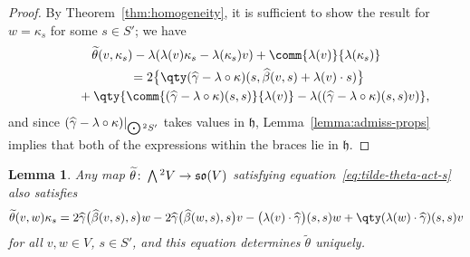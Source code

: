 \documentclass[pdftex]{sigma}
\numberwithin{equation}{section}
\newtheorem{Lemma}[Theorem]{Lemma}
\newcommand{\fh}{\mathfrak{h}}
\newcommand{\fso}{\mathfrak{so}}
\newcommand{\betahat}{\widehat{\beta}}
\newcommand{\gammahat}{\widehat{\gamma}}
\newcommand{\thetatilde}{\widetilde{\theta}}
\newcommand{\Wedge}{\mathchoice{{\textstyle\bigwedge}}{\bigwedge}{\bigwedge}{\bigwedge}}	%
\newcommand{\Odot}{\mathchoice{{\textstyle\bigodot}}{\bigodot}{\bigodot}{\bigodot}}
\newcommand{\1}{\mathbbm{1}}
\begin{document}
\begin{proof}
	By Theorem~\ref{thm:homogeneity}, it is sufficient to show the result for $w=\kappa_s$ for some $s\in S'$; we have
	\begin{gather*}
		\thetatilde(v,\kappa_s) - \lambda(\lambda(v)\kappa_s-\lambda(\kappa_s)v) + \comm{\lambda(v)}{\lambda(\kappa_s)}\\
			\qquad= 2\big\{\qty(\gammahat-\lambda\circ\kappa)(s,\betahat(v,s)+\lambda(v)\cdot s)\big\}\\
				\phantom{\qquad= }{} + \qty{\comm{(\gammahat-\lambda\circ\kappa)(s,s)}{\lambda(v)} - \lambda((\gammahat-\lambda\circ\kappa)(s,s)v)},
	\end{gather*}
	and since $(\gammahat-\lambda\circ\kappa)|_{\Odot^2S'}$ takes values in $\fh$, Lemma~\ref{lemma:admiss-props} implies that both of the expressions within the braces lie in $\fh$.
\end{proof}

\begin{Lemma}\label{lemma:tilde-theta-def-2}
	Any map $\thetatilde\colon\Wedge^2 V\to \fso(V)$ satisfying equation~\eqref{eq:tilde-theta-act-s} also satisfies
	\begin{gather*}
		\thetatilde(v,w)\kappa_s
			= 2\gammahat\bigl(\betahat(v,s),s\bigr)w
				- 2\gammahat\bigl(\betahat(w,s),s\bigr)v- \bigl(\lambda(v)\cdot\gammahat\bigr)(s,s)w
				+ \qty(\lambda(w)\cdot\gammahat)(s,s)v\label{eq:tilde-theta-def-2}
	\end{gather*}
	for all $v,w\in V$, $s\in S'$, and this equation determines $\thetatilde$ uniquely.
\end{Lemma}
\end{document}
